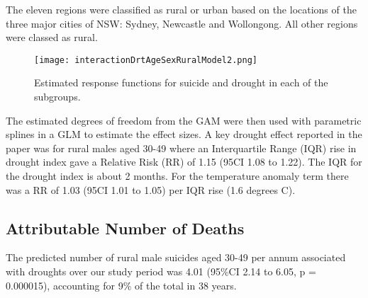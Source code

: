 \documentclass[a4paper]{article}                %
\begin{document}
        The eleven regions were classified as rural or urban based on the locations of the three major cities of NSW: Sydney, Newcastle and Wollongong. All other regions were classed as rural.






        \begin{figure}[!h]
        \centering
        \texttt{[image: interactionDrtAgeSexRuralModel2.png]}
        \caption{Estimated response functions for suicide and drought in each of the subgroups.}
        \label{fig:interactionDrtAgeSexRuralModel2.png}
        \end{figure}







        The estimated degrees of freedom from the GAM were then used with parametric splines in a GLM to estimate the effect sizes.  A key drought effect reported in the paper was for rural males aged 30-49 where an Interquartile Range (IQR) rise in drought index gave a Relative Risk (RR) of 1.15 (95CI 1.08 to 1.22).  The IQR for the drought index is about 2 months.
        For the temperature anomaly term there was a RR of 1.03 (95CI 1.01 to 1.05) per IQR rise (1.6 degrees C).


\clearpage

\subsection{Attributable Number of Deaths}


        The predicted number of rural male suicides aged 30-49 per annum associated with droughts over our study period was 4.01 (95\%CI 2.14 to 6.05, p = 0.000015), accounting for 9\% of the total in 38 years.
\end{document}
